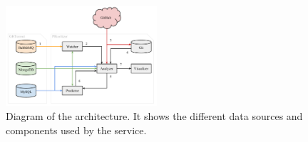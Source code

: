 \begin{figure}
  \centering
  \includegraphics[width=0.5\textwidth]{../figs/architecture.pdf}
  \caption[Diagram of the architecture]
   {Diagram of the architecture. It shows the different data sources and components used by the \prioritizer service.}
  \label{fig:architecture}
\end{figure}


